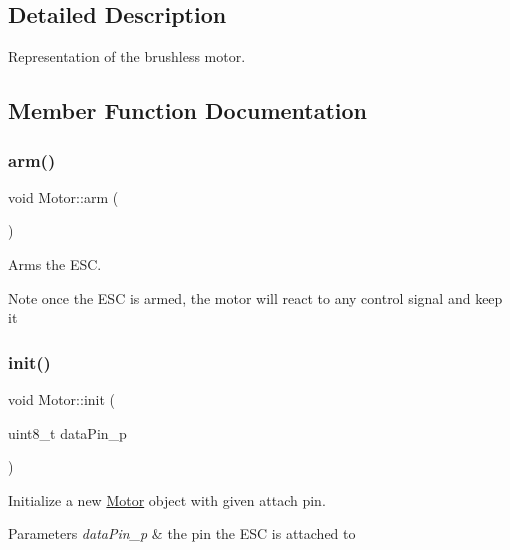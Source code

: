 \subsection{Detailed Description}
Representation of the brushless motor. 

\subsection{Member Function Documentation}
\mbox{\label{class_motor_af21376271175d094adf9a077f70d2208}} 
\subsubsection{\texorpdfstring{arm()}{arm()}}
{\footnotesize\ttfamily void Motor\+::arm (\begin{DoxyParamCaption}{ }\end{DoxyParamCaption})}



Arms the E\+SC. 

\begin{DoxyNote}{Note}
once the E\+SC is armed, the motor will react to any control signal and keep it 
\end{DoxyNote}
\mbox{\label{class_motor_a62bf4d19aed7729c5dd4a2c1148c86f8}} 
\subsubsection{\texorpdfstring{init()}{init()}}
{\footnotesize\ttfamily void Motor\+::init (\begin{DoxyParamCaption}\item[{uint8\+\_\+t}]{data\+Pin\+\_\+p }\end{DoxyParamCaption})}



Initialize a new \hyperlink{class_motor}{Motor} object with given attach pin. 


\begin{DoxyParams}{Parameters}
{\em data\+Pin\+\_\+p} & the pin the E\+SC is attached to \\
\hline
\end{DoxyParams}
\mbox{\label{class_motor_a9f6e92bbf36d9f68665bc1e02af075b6}} 
